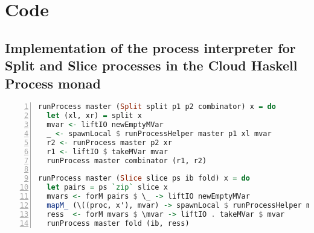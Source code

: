 \chapter{Code}

\section{Implementation of the process interpreter for Split and Slice processes in the Cloud Haskell Process monad}
\begin{lstlisting}[language=Haskell,frame=tb,numbers=left,caption=Implementation of \texttt{runProcess} for \texttt{Split} and \texttt{Slice} in the \textsf{Cloud Haskell} \texttt{Process} monad.]
runProcess master (Split split p1 p2 combinator) x = do
  let (xl, xr) = split x
  mvar <- liftIO newEmptyMVar
  _ <- spawnLocal $ runProcessHelper master p1 xl mvar
  r2 <- runProcess master p2 xr
  r1 <- liftIO $ takeMVar mvar
  runProcess master combinator (r1, r2)

runProcess master (Slice slice ps ib fold) x = do
  let pairs = ps `zip` slice x
  mvars <- forM pairs $ \_ -> liftIO newEmptyMVar
  mapM_ (\((proc, x'), mvar) -> spawnLocal $ runProcessHelper master proc x' mvar) (pairs `zip` mvars)
  ress  <- forM mvars $ \mvar -> liftIO . takeMVar $ mvar
  runProcess master fold (ib, ress)
\end{lstlisting}

